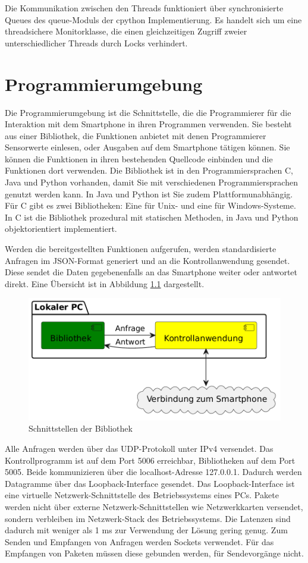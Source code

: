 \documentclass[11pt,a4paper]{report}
\begin{document}
Die Kommunikation zwischen den Threads funktioniert über synchronisierte Queues des queue-Moduls\cite{python_queue} der cpython Implementierung.
Es handelt sich um eine threadsichere Monitorklasse, die einen gleichzeitigen Zugriff zweier unterschiedlicher Threads durch Locks verhindert.

\chapter{Programmierumgebung}\label{chap:libs}
Die Programmierumgebung ist die Schnittstelle, die die Programmierer für die Interaktion mit dem Smartphone in ihren Programmen verwenden.
Sie besteht aus einer Bibliothek, die Funktionen anbietet mit denen Programmierer Sensorwerte einlesen, oder Ausgaben auf dem Smartphone tätigen können.
Sie können die Funktionen in ihren bestehenden Quellcode einbinden und die Funktionen dort verwenden.
Die Bibliothek ist in den Programmiersprachen C, Java und Python vorhanden, damit Sie mit verschiedenen Programmiersprachen genutzt werden kann.
In Java und Python ist Sie zudem Plattformunabhängig.
Für C gibt es zwei Bibliotheken: Eine für Unix- und eine für Windows-Systeme.
In C ist die Bibliothek prozedural mit statischen Methoden, in Java und Python objektorientiert implementiert.

Werden die bereitgestellten Funktionen aufgerufen, werden standardisierte Anfragen im JSON-Format generiert und an die Kontrollanwendung gesendet.
Diese sendet die Daten gegebenenfalls an das Smartphone weiter oder antwortet direkt.
Eine Übersicht ist in Abbildung \ref{fig:Schnittstelle Bibliothek} dargestellt.
\begin{figure}[htbp]
  \centering
  \includegraphics[width=.8\textwidth]{images/lib_server_connection}
  \caption{Schnittstellen der Bibliothek}
  \label{fig:Schnittstelle Bibliothek}
\end{figure}

Alle Anfragen werden über das UDP-Protokoll unter IPv4 versendet.
Das Kontrollprogramm ist auf dem Port 5006 erreichbar, Bibliotheken auf dem Port 5005.
Beide kommunizieren über die localhost-Adresse 127.0.0.1.
Dadurch werden Datagramme über das Loopback-Interface gesendet.
Das Loopback-Interface ist eine virtuelle Netzwerk-Schnittstelle des Betriebssystems eines PCs.
Pakete werden nicht über externe Netzwerk-Schnittstellen wie Netzwerkkarten versendet, sondern verbleiben im Netzwerk-Stack des Betriebssystems.
Die Latenzen sind dadurch mit weniger als 1 ms zur Verwendung der Lösung gering genug.
Zum Senden und Empfangen von Anfragen werden Sockets verwendet.
Für das Empfangen von Paketen müssen diese gebunden werden, für Sendevorgänge nicht.
\end{document}
